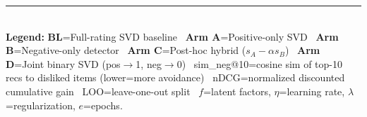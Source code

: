 \documentclass[9pt,a4paper,landscape]{article}
\begin{document}
\vspace{2pt}
\noindent\rule{\linewidth}{0.6pt}\\
\tiny
\textbf{Legend:} \textcolor{base}{\textbf{BL}}=Full-rating SVD baseline \
\textcolor{arma}{\textbf{Arm A}}=Positive-only SVD \
\textcolor{armb}{\textbf{Arm B}}=Negative-only detector \
\textcolor{armc}{\textbf{Arm C}}=Post-hoc hybrid ($s_A - \alpha s_B$) \
\textcolor{armd}{\textbf{Arm D}}=Joint binary SVD (pos$\to$1, neg$\to$0) \
sim\_neg@10=cosine sim of top-10 recs to disliked items (lower=more avoidance) \
nDCG=normalized discounted cumulative gain \
LOO=leave-one-out split \
$f$=latent factors, $\eta$=learning rate, $\lambda$=regularization, $e$=epochs.
\end{document}
